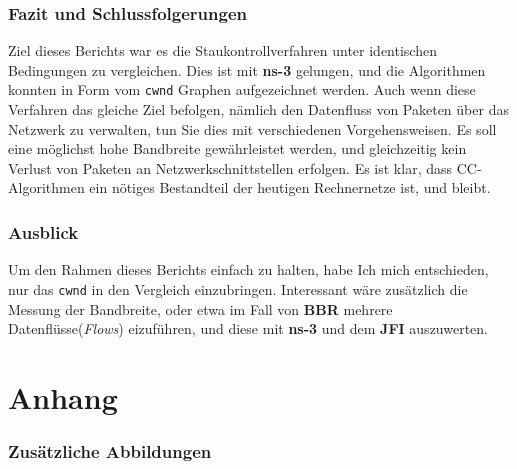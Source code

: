 \documentclass[paper=a4,fontsize=12pt,ngerman]{scrartcl}
\begin{document}
\section{Fazit und Schlussfolgerungen}
Ziel dieses Berichts war es die Staukontrollverfahren unter identischen Bedingungen zu vergleichen.
Dies ist mit \textbf{ns-3} gelungen, und die Algorithmen konnten in Form vom \texttt{cwnd} Graphen aufgezeichnet
werden.
Auch wenn diese Verfahren das gleiche Ziel befolgen, nämlich den Datenfluss von Paketen über das Netzwerk zu 
verwalten, tun Sie dies mit verschiedenen Vorgehensweisen. Es soll eine möglichst hohe Bandbreite gewährleistet
werden, und gleichzeitig kein Verlust von Paketen an Netzwerkschnittstellen erfolgen. Es ist klar, dass CC-Algorithmen
ein nötiges Bestandteil der heutigen Rechnernetze ist, und bleibt.


\section{Ausblick}
Um den Rahmen dieses Berichts einfach zu halten, habe Ich mich entschieden, nur das \texttt{cwnd} in den Vergleich 
einzubringen. Interessant wäre zusätzlich die Messung der Bandbreite, oder etwa im Fall von \textbf{BBR} mehrere Datenflüsse(\textit{Flows}) 
eizuführen, und diese mit \textbf{ns-3} und dem \textbf{JFI} auszuwerten. 



\clearpage
\renewcommand\refname{Literaturverzeichnis}





\clearpage
\appendix
\part*{Anhang}


\section{Zusätzliche Abbildungen}
\end{document}
